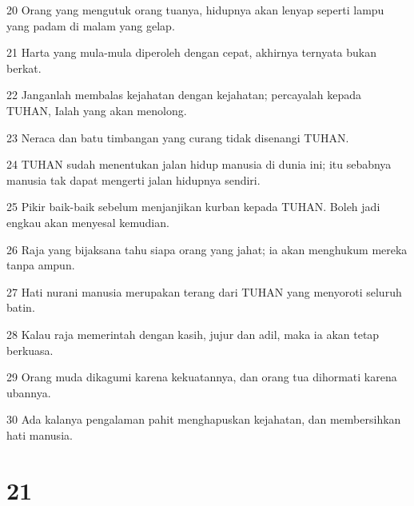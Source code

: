 \par 20 Orang yang mengutuk orang tuanya, hidupnya akan lenyap seperti lampu yang padam di malam yang gelap.
\par 21 Harta yang mula-mula diperoleh dengan cepat, akhirnya ternyata bukan berkat.
\par 22 Janganlah membalas kejahatan dengan kejahatan; percayalah kepada TUHAN, Ialah yang akan menolong.
\par 23 Neraca dan batu timbangan yang curang tidak disenangi TUHAN.
\par 24 TUHAN sudah menentukan jalan hidup manusia di dunia ini; itu sebabnya manusia tak dapat mengerti jalan hidupnya sendiri.
\par 25 Pikir baik-baik sebelum menjanjikan kurban kepada TUHAN. Boleh jadi engkau akan menyesal kemudian.
\par 26 Raja yang bijaksana tahu siapa orang yang jahat; ia akan menghukum mereka tanpa ampun.
\par 27 Hati nurani manusia merupakan terang dari TUHAN yang menyoroti seluruh batin.
\par 28 Kalau raja memerintah dengan kasih, jujur dan adil, maka ia akan tetap berkuasa.
\par 29 Orang muda dikagumi karena kekuatannya, dan orang tua dihormati karena ubannya.
\par 30 Ada kalanya pengalaman pahit menghapuskan kejahatan, dan membersihkan hati manusia.

\chapter{21}

